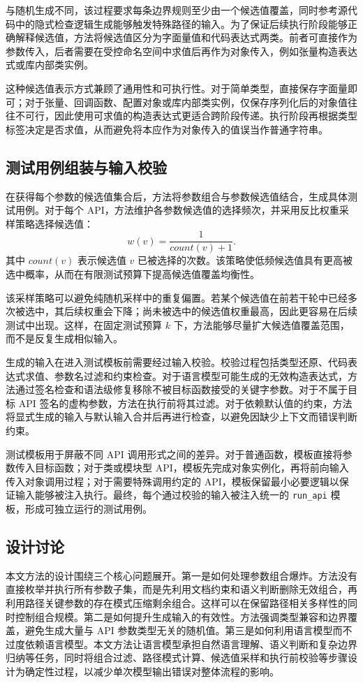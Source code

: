 \documentclass[UTF8,fontset=fandol]{ctexart}
\begin{document}
与随机生成不同，该过程要求每条边界规则至少由一个候选值覆盖，同时参考源代码中的隐式检查逻辑生成能够触发特殊路径的输入。为了保证后续执行阶段能够正确解释候选值，方法将候选值区分为字面量值和代码表达式两类。前者可直接作为参数传入，后者需要在受控命名空间中求值后再作为对象传入，例如张量构造表达式或库内部类实例。

这种候选值表示方式兼顾了通用性和可执行性。对于简单类型，直接保存字面量即可；对于张量、回调函数、配置对象或库内部类实例，仅保存序列化后的对象值往往不可行，因此使用可求值的构造表达式更适合跨阶段传递。执行阶段再根据类型标签决定是否求值，从而避免将本应作为对象传入的值误当作普通字符串。

\subsection{测试用例组装与输入校验}

在获得每个参数的候选值集合后，方法将参数组合与参数候选值结合，生成具体测试用例。对于每个 API，方法维护各参数候选值的选择频次，并采用反比权重采样策略选择候选值：
\[
w(v)=\frac{1}{count(v)+1}.
\]
其中 $count(v)$ 表示候选值 $v$ 已被选择的次数。该策略使低频候选值具有更高被选中概率，从而在有限测试预算下提高候选值覆盖均衡性。

该采样策略可以避免纯随机采样中的重复偏置。若某个候选值在前若干轮中已经多次被选中，其后续权重会下降；尚未被选中的候选值权重最高，因此更容易在后续测试中出现。这样，在固定测试预算 $k$ 下，方法能够尽量扩大候选值覆盖范围，而不是反复生成相似输入。

生成的输入在进入测试模板前需要经过输入校验。校验过程包括类型还原、代码表达式求值、参数名过滤和约束检查。对于语言模型可能生成的无效构造表达式，方法通过签名检查和语法级修复移除不被目标函数接受的关键字参数。对于不属于目标 API 签名的虚构参数，方法在执行前将其过滤。对于依赖默认值的约束，方法将显式生成的输入与默认输入合并后再进行检查，以避免因缺少上下文而错误判断约束。

测试模板用于屏蔽不同 API 调用形式之间的差异。对于普通函数，模板直接将参数传入目标函数；对于类或模块型 API，模板先完成对象实例化，再将前向输入传入对象调用过程；对于需要特殊调用约定的 API，模板保留最小必要逻辑以保证输入能够被注入执行。最终，每个通过校验的输入被注入统一的 \texttt{run\_api} 模板，形成可独立运行的测试用例。

\subsection{设计讨论}

本文方法的设计围绕三个核心问题展开。第一是如何处理参数组合爆炸。方法没有直接枚举并执行所有参数子集，而是先利用文档约束和语义判断删除无效组合，再利用路径关键参数的存在模式压缩剩余组合。这样可以在保留路径相关多样性的同时控制组合规模。第二是如何提升生成输入的有效性。方法强调类型兼容和边界覆盖，避免生成大量与 API 参数类型无关的随机值。第三是如何利用语言模型而不过度依赖语言模型。本文方法让语言模型承担自然语言理解、语义判断和复杂边界归纳等任务，同时将组合过滤、路径模式计算、候选值采样和执行前校验等步骤设计为确定性过程，以减少单次模型输出错误对整体流程的影响。
\end{document}
